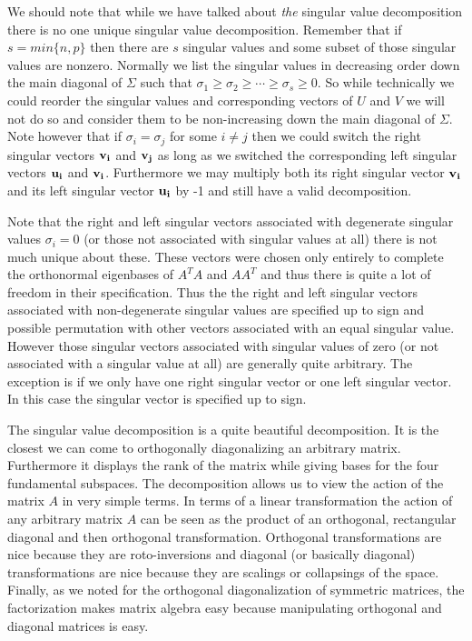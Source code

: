 \documentclass{book}
\begin{document}
We should note that while we have talked about \emph{the} singular value decomposition there is no one unique singular value decomposition. Remember that if $s=min\{n,p\}$ then there are $s$ singular values and some subset of those singular values are nonzero. Normally we list the singular values in decreasing order down the main diagonal of $\Sigma$ such that $\sigma_1\geq \sigma_2\geq \cdots \geq \sigma_s \geq 0$. So while technically we could reorder the singular values and corresponding vectors of $U$ and $V$ we will not do so and consider them to be non-increasing down the main diagonal of $\Sigma$. Note however that if $\sigma_i=\sigma_j$ for some $i \neq j$ then we could switch the right singular vectors ${\bf v_i}$ and ${\bf v_j}$ as long as we switched the corresponding left singular vectors ${\bf u_i}$ and ${\bf v_i}$. Furthermore we may multiply both its right singular vector ${\bf v_i}$ and its left singular vector ${\bf u_i}$ by -1 and still have a valid decomposition. 

Note that the right and left singular vectors associated with degenerate singular values $\sigma_i=0$ (or those not associated with singular values at all) there is not much unique about these. These vectors were chosen only entirely to complete the orthonormal eigenbases of $A^TA$ and $AA^T$ and thus there is quite a lot of freedom in their specification. Thus the the right and left singular vectors associated with non-degenerate singular values are specified up to sign and possible permutation with other vectors associated with an equal singular value. However those singular vectors associated with singular values of zero (or not associated with a singular value at all) are generally quite arbitrary. The exception is if we only have one right singular vector or one left singular vector. In this case the singular vector is specified up to sign. 

The singular value decomposition is a quite beautiful decomposition. It is the closest we can come to orthogonally diagonalizing an arbitrary matrix. Furthermore it displays the rank of the matrix while giving bases for the four fundamental subspaces. The decomposition allows us to view the action of the matrix $A$ in very simple terms. In terms of a linear transformation the action of any arbitrary matrix $A$ can be seen as the product of an orthogonal, rectangular diagonal and then orthogonal transformation. Orthogonal transformations are nice because they are roto-inversions and diagonal (or basically diagonal) transformations are nice because they are scalings or collapsings of the space. Finally, as we noted for the orthogonal diagonalization of symmetric matrices, the factorization makes matrix algebra easy because manipulating orthogonal and diagonal matrices is easy. 
\end{document}
